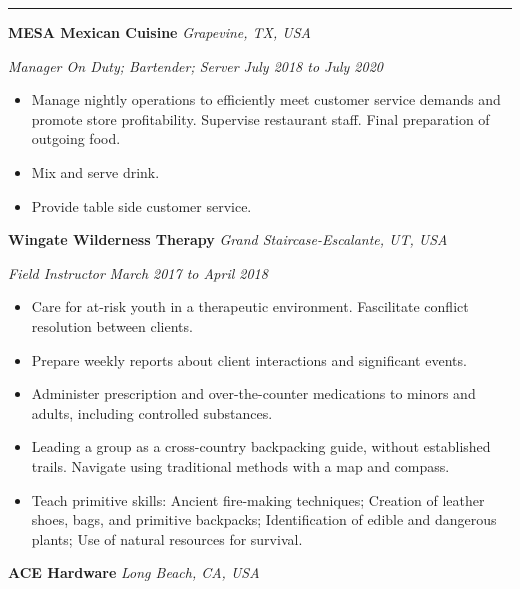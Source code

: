 \documentclass[10pt, a4paper]{article}
\newcommand{\rangesep}{to\xspace}  %
\renewcommand{\date}[1]{\textit{#1}}
\newcommand{\location}[1]{\textit{#1}}
\newcommand{\heading}[1]{
    \makebox[0pt][l]{\Large \sc \hspace{2pt}#1}
    \rule[-0.7ex]{\columnwidth}{0.5pt}\vspace{1.0ex}
}
\newcommand{\subheading}[1]{{\bfseries #1}}
\newcommand{\subheadSkip}{\vspace{0.7ex}}
\newenvironment{mysection}[1]
{\vspace{2.5ex}
\heading{#1}
\begin{adjustwidth}{0.3cm}{0cm}}
{\end{adjustwidth} }
\begin{document}
    \newpage
    \begin{mysection}{Employment \large{(continued)}}

        \subheadSkip
        \subheading{MESA Mexican Cuisine} \hfill \location{Grapevine, TX, USA}

        \textit{Manager On Duty; Bartender; Server} \hfill \date{July 2018 \rangesep July 2020}

        \begin{itemize}
            \item Manage nightly operations to efficiently meet customer service demands and promote store profitability. Supervise restaurant staff. Final preparation of outgoing food.
            \item Mix and serve drink.
            \item Provide table side customer service.
        \end{itemize}

        \subheadSkip
        \subheading{Wingate Wilderness Therapy} \hfill \location{Grand Staircase-Escalante, UT, USA}

        \vspace{0.1ex}
        \textit{Field Instructor} \hfill \date{March 2017 \rangesep April 2018}
        \begin{itemize}
            \item Care for at-risk youth in a therapeutic environment. Fascilitate conflict resolution between clients. 
            \item Prepare weekly reports about client interactions and significant events. 
            \item Administer prescription and over-the-counter medications to minors and adults, including controlled substances.
            \item Leading a group as a cross-country backpacking guide, without established trails. Navigate using traditional methods with a map and compass.
            \item Teach primitive skills: Ancient fire-making techniques; Creation of leather shoes, bags, and primitive backpacks; Identification of edible and dangerous plants; Use of natural resources for survival.
        \end{itemize}

        \subheadSkip
        \subheading{ACE Hardware} \hfill \location{Long Beach, CA, USA}


\end{mysection}
\end{document}
